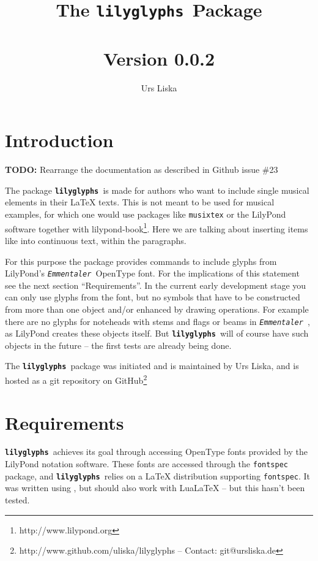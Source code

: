 \documentclass{article}
\newcommand*{\lilyglyphs}{\texttt{\textbf{lilyglyphs\,}}}
\newcommand*{\emmentaler}{\texttt{\textit{Emmentaler }}}
\begin{document}
\title{The \lilyglyphs Package\\~\\
	\normalsize Version 0.0.2}
\author{Urs Liska}

\maketitle
\tableofcontents

\pagebreak
\section{Introduction}
{\color{red} \textbf{TODO:} Rearrange the documentation as described in Github issue \#23}

The package \lilyglyphs is made for authors who want to include single musical elements in their \LaTeX{} texts. 
This is not meant to be used for musical examples, for which one would use packages like \texttt{musixtex} or the LilyPond software together with lilypond-book\footnote{http://www.lilypond.org}. 
Here we are talking about inserting items like \lilyRFZ* into continuous text, within the paragraphs.

For this purpose the package provides commands to include glyphs from LilyPond's \emmentaler OpenType font. 
For the implications of this statement see the next section \enquote{Requirements}. 
In the current early development stage you can only use glyphs from the font, but no symbols that have to be constructed from more than one object and/or enhanced by drawing operations. 
For example there are no glyphs for noteheads with stems and flags or beams in \emmentaler, as LilyPond creates these objects itself. 
But \lilyglyphs will of course have such objects in the future -- the first tests are already being done.

The \lilyglyphs package was initiated and is maintained by Urs Liska, and is hosted as a git repository on GitHub\footnote{http://www.github.com/uliska/lilyglyphs -- Contact: git@ursliska.de}

\section{Requirements}
\lilyglyphs achieves its goal through accessing OpenType fonts provided by the LilyPond notation software. 
These fonts are accessed through the \texttt{fontspec} package, and \lilyglyphs relies on a \LaTeX{} distribution supporting \texttt{fontspec}. 
It was written using \XeLaTeX, but should also work with LuaLaTeX -- but this hasn't been tested.
\end{document}
